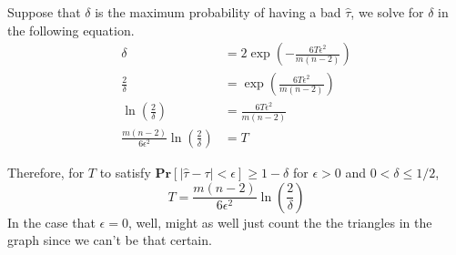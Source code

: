 Suppose that $\delta$ is the maximum probability of having a bad $\hat{\tau}$, we solve for $\delta$ in the following equation.
\[
\begin{aligned}
  \delta &= 2\exp\left(-\frac{6T\epsilon^2}{m(n-2)}\right) \\
  \frac{2}{\delta} &= \exp\left(\frac{6T\epsilon^2}{m(n-2)}\right) \\
  \ln\left(\frac{2}{\delta}\right) &= \frac{6T\epsilon^2}{m(n-2)} \\
  \frac{m(n-2)}{6\epsilon^2}\ln\left(\frac{2}{\delta}\right) &= T
\end{aligned}  
\]

Therefore, for $T$ to satisfy $\mathbf{Pr}[|\hat{\tau} - \tau| < \epsilon] \geq 1 - \delta$ for $\epsilon > 0$ and $0 < \delta \leq 1/2$,
\[ T = \frac{m(n-2)}{6\epsilon^2}\ln\left(\frac{2}{\delta}\right) \]
In the case that $\epsilon = 0$, well, might as well just count the the triangles in the graph since we can't be that certain.

